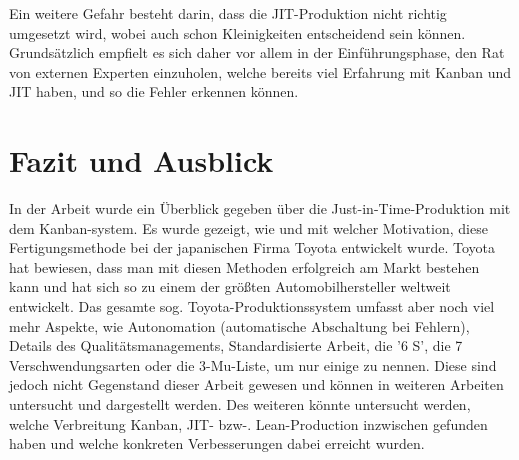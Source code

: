 Ein weitere Gefahr besteht darin, dass die JIT-Produktion nicht richtig umgesetzt wird, wobei auch schon Kleinigkeiten entscheidend sein können.
Grundsätzlich empfielt es sich daher vor allem in der Einführungsphase, den Rat von externen Experten einzuholen, 
welche bereits viel Erfahrung mit Kanban und JIT haben, und so die Fehler erkennen können.

\section{Fazit und Ausblick}
In der Arbeit wurde ein Überblick gegeben über die Just-in-Time-Produktion mit dem Kanban-system.
Es wurde gezeigt, wie und mit welcher Motivation, diese Fertigungsmethode bei der japanischen Firma Toyota entwickelt wurde.
Toyota hat bewiesen, dass man mit diesen Methoden erfolgreich am Markt bestehen kann und hat sich so zu einem der größten Automobilhersteller weltweit entwickelt.
Das gesamte sog. Toyota-Produktionssystem umfasst aber noch viel mehr Aspekte, wie Autonomation (automatische Abschaltung bei Fehlern), 
Details des Qualitätsmanagements, Standardisierte Arbeit, die '6 S', die 7 Verschwendungsarten oder die 3-Mu-Liste, um nur einige zu nennen. 
Diese sind jedoch nicht Gegenstand dieser Arbeit gewesen und können in weiteren Arbeiten untersucht und dargestellt werden. Des weiteren könnte untersucht werden, 
welche Verbreitung Kanban, JIT- bzw-. Lean-Production inzwischen gefunden haben und welche konkreten Verbesserungen dabei erreicht wurden.

